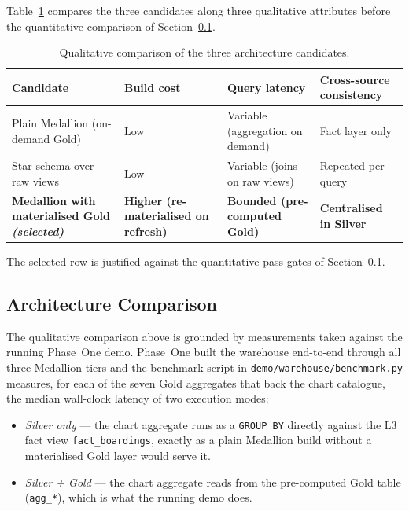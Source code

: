 Table~\ref{tab:arch:qualitative} compares the three candidates along
three qualitative attributes before the quantitative comparison of
Section~\ref{sec:solution:architecture:quantitative}.

\begin{table}[!htbp]
  \centering
  \caption{Qualitative comparison of the three architecture candidates.}
  \label{tab:arch:qualitative}
  \footnotesize
  \renewcommand{\arraystretch}{1.3}
  \begin{tabularx}{\linewidth}{p{4.5cm} X X X}
    \hline
    \textbf{Candidate} & \textbf{Build cost} & \textbf{Query latency} & \textbf{Cross-source consistency} \\
    \hline
    Plain Medallion (on-demand Gold) \cite{databricksMedallion}      & Low         & Variable (aggregation on demand)    & Fact layer only \\
    Star schema over raw views                            & Low    & Variable (joins on raw views)           & Repeated per query \\
    \textbf{Medallion with materialised Gold \textit{(selected)}} & \textbf{Higher (re-materialised on refresh)} & \textbf{Bounded (pre-computed Gold)} & \textbf{Centralised in Silver} \\
    \hline
  \end{tabularx}
\end{table}

The selected row is justified against the quantitative pass gates of
Section~\ref{sec:solution:architecture:quantitative}.

\subsection{Architecture Comparison}
\label{sec:solution:architecture:quantitative}

The qualitative comparison above is grounded by measurements taken
against the running Phase~One demo. Phase~One built the
warehouse end-to-end through all three Medallion tiers and the
benchmark script in \texttt{demo/warehouse/benchmark.py} measures, for
each of the seven Gold aggregates that back the chart catalogue, the
median wall-clock latency of two execution modes:

\begin{itemize}
\item \emph{Silver only} --- the chart aggregate runs as a
      \texttt{GROUP BY} directly against the L3 fact view
      \texttt{fact\_boardings}, exactly as a plain Medallion build
      without a materialised Gold layer would serve it.
\item \emph{Silver + Gold} --- the chart aggregate reads from the
      pre-computed Gold table (\texttt{agg\_*}), which is what the
      running demo does.
\end{itemize}

